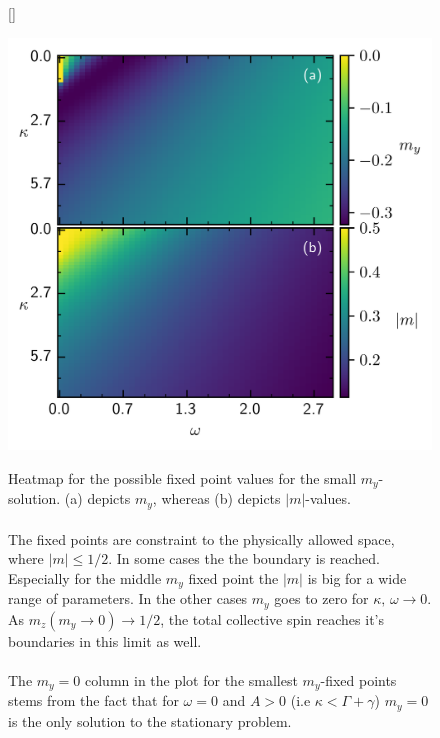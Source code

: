 \documentclass{article}
\begin{document}
\begin{figure}[H]
    [\FBwidth]
    {\caption{Heatmap for the possible fixed point values for the small $m_y$-solution. (a) depicts $m_y$, whereas (b) depicts $|m|$-values.\\\\
    The fixed points are constraint to the physically allowed space, where $|m|\leq1/2$. In some cases the the boundary is reached. Especially for the middle $m_y$ fixed point the $|m|$ is big for a wide range of parameters. In the other cases $m_y$ goes to zero for $\kappa,\,\omega\rightarrow0$. \\
    As $m_z(m_y\rightarrow0)\rightarrow1/2$, the total collective spin reaches it's boundaries in this limit as well.\\\\ 
    The $m_y=0$ column in the plot for the smallest $m_y$-fixed points stems from the fact that for $\omega=0$ and $A>0$ (i.e $\kappa<\Gamma+\gamma$) $m_y=0$ is the only solution to the stationary problem.}}
    {\includegraphics{pictures/fixp_bound_heatmap_s.png}}
    \label{fig:fixp_small_bound_hm}
\end{figure}
\end{document}
